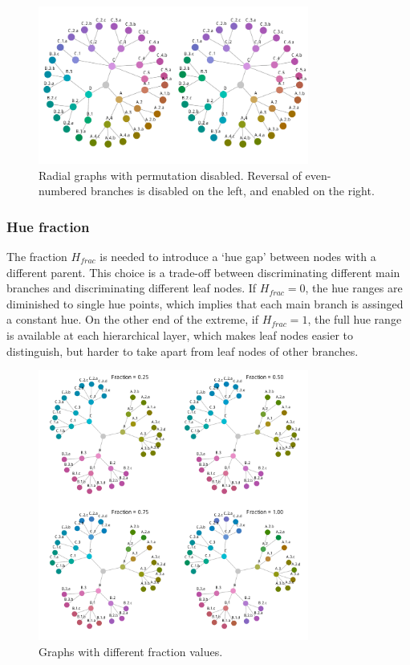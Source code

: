 \documentclass[journal]{vgtc}                %
\begin{document}
\begin{figure}[tb]

  \centering
  \includegraphics[width=3.5in]{HCPgraph2.pdf}
  \caption{Radial graphs with permutation disabled. Reversal of even-numbered branches is disabled on the left, and enabled on the right.}\label{fig:graph_noperm}

\end{figure}


\subsubsection{Hue fraction}\label{secf}

The fraction $H_{frac}$ is needed to introduce a `hue gap' between nodes with a different parent. This choice is a trade-off between discriminating different main branches and discriminating different leaf nodes. If $H_{frac}=0$, the hue ranges are diminished to single hue points, which implies that each main branch is assinged a constant hue. On the other end of the extreme, if $H_{frac}=1$, the full hue range is available at each hierarchical layer, which makes leaf nodes easier to distinguish, but harder to take apart from leaf nodes of other branches.

\begin{figure}[tb]
  \centering
  \includegraphics[width=3.5in]{Graph_hue.pdf}
  \caption{Graphs with different fraction values.}\label{fig:graphf}
\end{figure}
\end{document}
